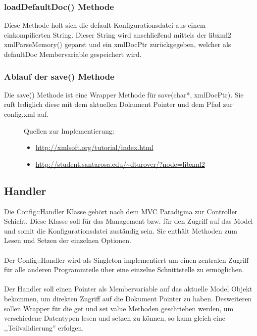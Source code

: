 \subsubsection{loadDefaultDoc() Methode}
Diese Methode holt sich die default Konfigurationsdatei aus einem einkompilierten String.
Dieser String wird anschließend mittels der libxml2 xmlParseMemory() geparst und ein xmlDocPtr zurückgegeben, welcher als defaultDoc Membervariable gespeichert wird.

\subsubsection{Ablauf der save() Methode}
Die save() Methode ist eine Wrapper Methode für save(char*, xmlDocPtr). Sie ruft lediglich diese mit dem aktuellen Dokument Pointer und dem Pfad zur config.xml auf.

\begin{figure}[htb!]
    Quellen zur Implementierung:
    \begin{itemize}
        \item \url{http://xmlsoft.org/tutorial/index.html}
        \item \url{http://student.santarosa.edu/~dturover/?node=libxml2}
    \end{itemize}
\end{figure}



\subsection{Handler}
Die Config::Handler Klasse gehört nach dem MVC Paradigma zur Controller Schicht. Diese Klasse soll für das Management bzw. für den
Zugriff auf das Model und somit die Konfigurationsdatei zuständig sein. Sie enthält Methoden zum Lesen und Setzen der einzelnen Optionen.
\\
\\
Der Config::Handler wird als Singleton implementiert um einen zentralen Zugriff für alle anderen Programmteile über eine einzelne Schnittstelle zu ermöglichen.
\\
\\
Der Handler soll einen Pointer als Membervariable auf das aktuelle Model Objekt bekommen, um direkten Zugriff auf die Dokument Pointer
zu haben. Desweiteren sollen Wrapper für die get und set value Methoden geschrieben werden, um verschiedene Datentypen lesen und setzen zu können, so kann gleich eine ,,Teilvalidierung'' erfolgen.

